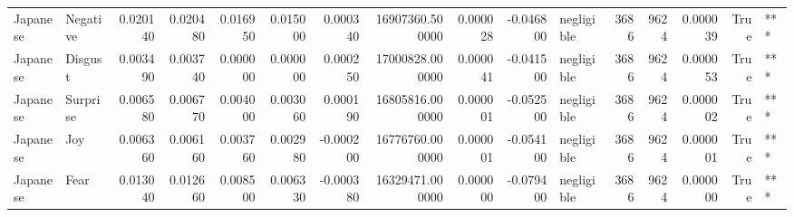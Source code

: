 \begin{tabular}{llrrrrrrrrlrrrrl}
Japanese & Negative & 0.020140 & 0.020480 & 0.016950 & 0.015000 & 0.000340 & 16907360.500000 & 0.000028 & -0.046800 & negligible & 3686 & 9624 & 0.000039 & True & *** \\
Japanese & Disgust & 0.003490 & 0.003740 & 0.000000 & 0.000000 & 0.000250 & 17000828.000000 & 0.000041 & -0.041500 & negligible & 3686 & 9624 & 0.000053 & True & *** \\
Japanese & Surprise & 0.006580 & 0.006770 & 0.004000 & 0.003060 & 0.000190 & 16805816.000000 & 0.000001 & -0.052500 & negligible & 3686 & 9624 & 0.000002 & True & *** \\
Japanese & Joy & 0.006360 & 0.006160 & 0.003760 & 0.002980 & -0.000200 & 16776760.000000 & 0.000001 & -0.054100 & negligible & 3686 & 9624 & 0.000001 & True & *** \\
Japanese & Fear & 0.013040 & 0.012660 & 0.008500 & 0.006330 & -0.000380 & 16329471.000000 & 0.000000 & -0.079400 & negligible & 3686 & 9624 & 0.000000 & True & *** \\
\bottomrule
\end{tabular}
